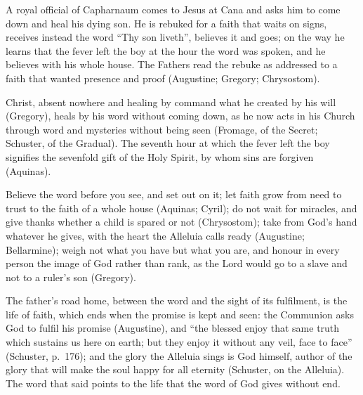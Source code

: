 \begin{fourSenses}
\item[Literal.] A royal official of Capharnaum comes to Jesus at Cana and asks
him to come down and heal his dying son. He is rebuked for a faith that waits on
signs, receives instead the word ``Thy son liveth'', believes it and goes; on
the way he learns that the fever left the boy at the hour the word was spoken,
and he believes with his whole house. The Fathers read the rebuke as addressed
to a faith that wanted presence and proof (Augustine; Gregory; Chrysostom).

\item[Allegorical.] Christ, absent nowhere and healing by command what he
created by his will (Gregory), heals by his word without coming down, as he now
acts in his Church through word and mysteries without being seen (Fromage, of
the Secret; Schuster, of the Gradual). The seventh hour at which the fever left
the boy signifies the sevenfold gift of the Holy Spirit, by whom sins are
forgiven (Aquinas).

\item[Moral.] Believe the word before you see, and set out on it; let faith grow
from need to trust to the faith of a whole house (Aquinas; Cyril); do not wait
for miracles, and give thanks whether a child is spared or not (Chrysostom);
take from God's hand whatever he gives, with the heart the Alleluia calls ready
(Augustine; Bellarmine); weigh not what you have but what you are, and honour
in every person the image of God rather than rank, as the Lord would go to a
slave and not to a ruler's son (Gregory).

\item[Anagogical.] The father's road home, between the word and the sight of
its fulfilment, is the life of faith, which ends when the promise is kept and
seen: the Communion asks God to fulfil his promise (Augustine), and ``the
blessed enjoy that same truth which sustains us here on earth; but they enjoy
it without any veil, face to face'' (Schuster, p.~176); and the glory the
Alleluia sings is God himself, author of the glory that will make the soul
happy for all eternity (Schuster, on the Alleluia). The word that said
 points to the life that the word of God gives without end.
\end{fourSenses}
